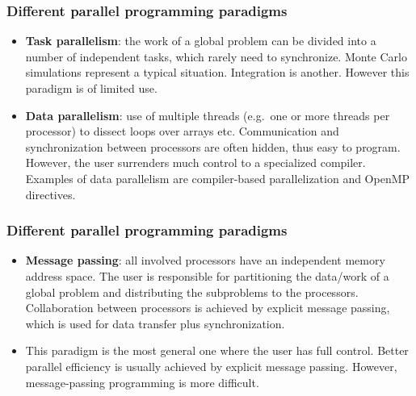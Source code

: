 \documentclass{beamer}
\begin{document}
\begin{frame}
\frametitle{Different parallel programming paradigms}

\begin{block}{}

\begin{itemize}
\item \textbf{Task parallelism}:  the work of a global problem can be divided into a number of independent tasks, which rarely need to synchronize.  Monte Carlo simulations represent a typical situation. Integration is another. However this paradigm is of limited use.

\item \textbf{Data parallelism}:  use of multiple threads (e.g.~one or more threads per processor) to dissect loops over arrays etc.  Communication and synchronization between processors are often hidden, thus easy to program. However, the user surrenders much control to a specialized compiler. Examples of data parallelism are compiler-based parallelization and OpenMP directives. 
\end{itemize}

\noindent
\end{block}
\end{frame}

\begin{frame}
\frametitle{Different parallel programming paradigms}

\begin{block}{}

\begin{itemize}
\item \textbf{Message passing}:  all involved processors have an independent memory address space. The user is responsible for  partitioning the data/work of a global problem and distributing the  subproblems to the processors. Collaboration between processors is achieved by explicit message passing, which is used for data transfer plus synchronization.

\item This paradigm is the most general one where the user has full control. Better parallel efficiency is usually achieved by explicit message passing. However, message-passing programming is more difficult.
\end{itemize}

\noindent
\end{block}
\end{frame}
\end{document}
